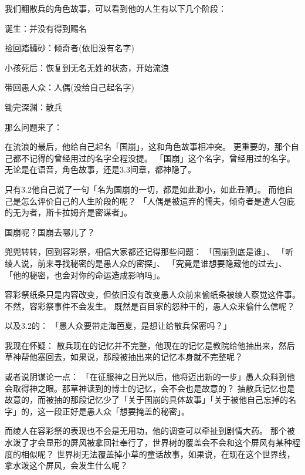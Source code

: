 \dividearticles
{}
\begin{multicols}{2}
	我们翻散兵的角色故事，可以看到他的人生有以下几个阶段：

	诞生：并没有得到赐名

	捡回踏鞴砂：倾奇者(依旧没有名字)

	小孩死后：恢复到无名无姓的状态，开始流浪

	带回愚人众：人偶(没给自己起名字)

	锄完深渊：散兵

	那么问题来了：

	在流浪的最后，他给自己起名「国崩」，这和角色故事相冲突。
	更重要的，那个自己都不记得的曾经用过的名字全程没提。
	「国崩」这个名字，曾经用过的名字。无论是在语音，角色故事，还是3.3间章，都神隐了。

	只有3.2他自己说了一句「名为国崩的一切，都是如此渺小，如此丑陋」。
	而他自己是怎么评价自己的人生阶段的呢？
	「人偶是被遗弃的懦夫，倾奇者是遭人包庇的无为者，斯卡拉姆齐是密谋者」。

	国崩呢？国崩去哪儿了？

	兜兜转转，回到容彩祭，相信大家都还记得那些问题：
	「国崩到底是谁」、
	「听绫人说，前来寻找秘密的是愚人众的密探」、
	「究竟是谁想要隐藏他的过去」、
	「他的秘密，也会对你的命运造成影响吗」。

	容彩祭纸条只是内容改变，但依旧没有改变愚人众前来偷纸条被绫人察觉这件事。不然，容彩祭事件不会发生。
	既然是百目家的怨种干的，愚人众来偷什么信呢？

	以及3.2的：
	「愚人众要带走海芭夏，是想让给散兵保密吗？」

	我现在怀疑：
	散兵现在的记忆并不完整，他现在的记忆是教院给他抽出来，然后草神帮他塞回去，如果说，那段被抽出来的记忆本身就不完整呢？

	或者说阴谋论一点：
	「在征服神之目光以后，他将迈出新的一步」愚人众料到他会取得神之眼。那草神读到的博士的记忆，会不会也是故意的？
	抽散兵记忆也是故意的，而被抽的那段记忆少了「关于国崩的具体故事」「关于被他自己忘掉的名字」的，这一段正好是愚人众「想要掩盖的秘密」。

	而绫人在容彩祭的表现也不会是无用功，他的调查可以牵扯到剧情大药。
	那个被水泼了才会显形的屏风被拿回社奉行了，世界树的覆盖会不会和这个屏风有某种程度的相似呢？
	世界树无法覆盖掉小草的童话故事，如果说，在现在这个世界线，拿水泼这个屏风，会发生什么呢？


\end{multicols}
